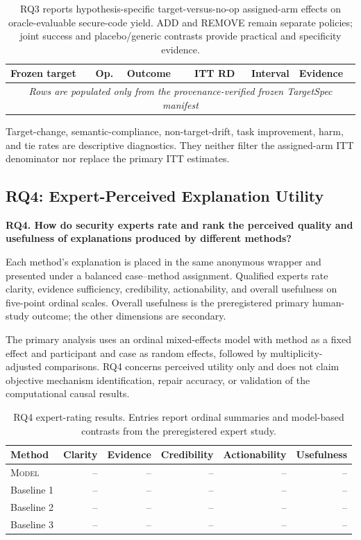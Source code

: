 \documentclass[acmsmall,screen,review,anonymous]{acmart}
\newcommand{\model}{\textsc{Model}\xspace}
\begin{document}
\begin{table}[H]
  \centering
  \small
  \caption{RQ3 reports hypothesis-specific target-versus-no-op assigned-arm
  effects on oracle-evaluable secure-code yield. ADD and REMOVE remain separate
  policies; joint success and placebo/generic contrasts provide practical and
  specificity evidence.}
  \label{tab:rq3}
  \begin{tabular}{lllrrl}
    \toprule
    Frozen target & Op. & Outcome & ITT RD & Interval & Evidence \\
    \midrule
    \multicolumn{6}{c}{\emph{Rows are populated only from the
    provenance-verified frozen TargetSpec manifest}} \\
    \bottomrule
  \end{tabular}
\end{table}

Target-change, semantic-compliance, non-target-drift, task improvement, harm,
and tie rates are descriptive diagnostics. They neither filter the assigned-arm
ITT denominator nor replace the primary ITT estimates.

\subsection{RQ4: Expert-Perceived Explanation Utility}

\textbf{RQ4. How do security experts rate and rank the perceived quality and
usefulness of explanations produced by different methods?}

Each method's explanation is placed in the same anonymous wrapper and presented
under a balanced case--method assignment. Qualified experts rate clarity,
evidence sufficiency, credibility, actionability, and overall usefulness on
five-point ordinal scales. Overall usefulness is the preregistered primary
human-study outcome; the other dimensions are secondary.

The primary analysis uses an ordinal mixed-effects model with method as a fixed
effect and participant and case as random effects, followed by
multiplicity-adjusted comparisons. RQ4 concerns perceived utility only and
does not claim objective mechanism identification, repair accuracy, or
validation of the computational causal results.

\begin{table}[H]
  \centering
  \small
  \caption{RQ4 expert-rating results. Entries report ordinal summaries and
  model-based contrasts from the preregistered expert study.}
  \label{tab:rq4}
  \begin{tabular}{lrrrrr}
    \toprule
    Method & Clarity & Evidence & Credibility & Actionability & Usefulness \\
    \midrule
    \model & -- & -- & -- & -- & -- \\
    Baseline 1 & -- & -- & -- & -- & -- \\
    Baseline 2 & -- & -- & -- & -- & -- \\
    Baseline 3 & -- & -- & -- & -- & -- \\
    \bottomrule
  \end{tabular}
\end{table}
\end{document}
